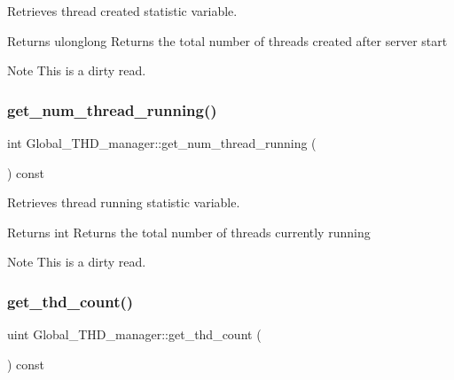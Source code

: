 Retrieves thread created statistic variable. \begin{DoxyReturn}{Returns}
ulonglong Returns the total number of threads created after server start 
\end{DoxyReturn}
\begin{DoxyNote}{Note}
This is a dirty read. 
\end{DoxyNote}
\mbox{\label{classGlobal__THD__manager_a751a7e09cf025b578e425723a3fbe22e}} 
\subsubsection{\texorpdfstring{get\+\_\+num\+\_\+thread\+\_\+running()}{get\_num\_thread\_running()}}
{\footnotesize\ttfamily int Global\+\_\+\+T\+H\+D\+\_\+manager\+::get\+\_\+num\+\_\+thread\+\_\+running (\begin{DoxyParamCaption}{ }\end{DoxyParamCaption}) const\hspace{0.3cm}{\ttfamily [inline]}}

Retrieves thread running statistic variable. \begin{DoxyReturn}{Returns}
int Returns the total number of threads currently running 
\end{DoxyReturn}
\begin{DoxyNote}{Note}
This is a dirty read. 
\end{DoxyNote}
\mbox{\label{classGlobal__THD__manager_a1da81e89755632c72454b9570a544ad3}} 
\subsubsection{\texorpdfstring{get\+\_\+thd\+\_\+count()}{get\_thd\_count()}}
{\footnotesize\ttfamily uint Global\+\_\+\+T\+H\+D\+\_\+manager\+::get\+\_\+thd\+\_\+count (\begin{DoxyParamCaption}{ }\end{DoxyParamCaption}) const\hspace{0.3cm}{\ttfamily [inline]}}

